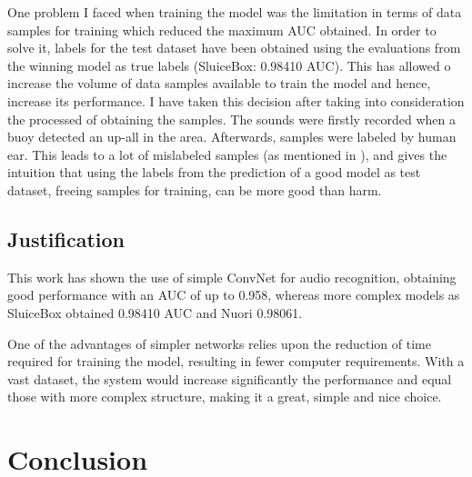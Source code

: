 \documentclass[]{article}
\begin{document}
One problem I faced when training the model was the limitation in terms of data samples for training which reduced the maximum AUC obtained. In order to solve it, labels for the test dataset have been obtained using the evaluations from the winning model as true labels (SluiceBox: 0.98410 AUC). This has allowed o increase the volume of data samples available to train the model and hence, increase its performance. I have taken this decision after taking into consideration the processed of obtaining the samples. The sounds were firstly recorded when a buoy detected an up-all in the area. Afterwards, samples were labeled by human ear. This leads to a lot of mislabeled samples (as mentioned in \cite{Nouriblog}), and gives the intuition that using the labels from the prediction of a good model as test dataset, freeing samples for training, can be more good than harm.



\subsection{Justification}\label{justification}

This work has shown the use of simple ConvNet for audio recognition, obtaining good performance with an AUC of up to 0.958, whereas more complex models as SluiceBox obtained 0.98410 AUC and Nuori 0.98061. 

One of the advantages of simpler networks relies upon the reduction of time required for training the model, resulting in fewer computer requirements. With a vast dataset, the system would increase significantly the performance and equal those with more complex structure, making it a great, simple and nice choice. %


\section{Conclusion}\label{v.-conclusion}
\end{document}
